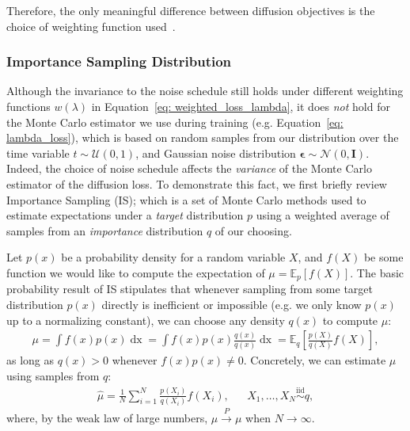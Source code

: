 Therefore, the only meaningful difference between diffusion objectives is the choice of weighting function used~\citep{kingma2023understanding}.

\subsubsection{Importance Sampling Distribution}
%
Although the invariance to the noise schedule still holds under different weighting functions $w(\lambda)$ in Equation~\ref{eq: weighted_loss_lambda}, it does \textit{not} hold for the Monte Carlo estimator we use during training (e.g. Equation~\ref{eq: lambda_loss}), which is based on random samples from our distribution over the time variable $t \sim \mathcal{U}(0,1)$, and Gaussian noise distribution $\boldsymbol{\epsilon} \sim \mathcal{N}(0,\mathbf{I})$. Indeed, the choice of noise schedule affects the \textit{variance} of the Monte Carlo estimator of the diffusion loss. To demonstrate this fact, we first briefly review Importance Sampling (IS); which is a set of Monte Carlo methods used to estimate expectations under a \textit{target} distribution $p$ using a weighted average of samples from an \textit{importance} distribution $q$ of our choosing. 

Let $p(x)$ be a probability density for a random variable $X$, and $f(X)$ be some function we would like to compute the expectation of $\mu = \mathbb{E}_p\left[f(X)\right]$. The basic probability result of IS stipulates that whenever sampling from some target distribution $p(x)$ directly is inefficient or impossible (e.g. we only know $p(x)$ up to a normalizing constant), we can choose any density $q(x)$ to compute $\mu$:   
%
\begin{align}
    \mu = \int f(x)p(x) \mathop{\mathrm{d}x} = \int f(x) p(x) \frac{q(x)}{q(x)} \mathop{\mathrm{d}x} = \mathbb{E}_{q}\left[ \frac{p(X)}{q(X)}f(X)\right],
\end{align}
%
as long as $q(x) > 0$ whenever $f(x)p(x) \neq 0$. Concretely, we can estimate $\mu$ using samples from $q$:
%
\begin{align}
    &&\widehat{\mu} = \frac{1}{N} \sum_{i=1}^N \frac{p(X_i)}{q(X_i)}f(X_i), &&X_1,\dots,X_N \mathop{\sim}\limits^{\mathrm{iid}} q,&&
\end{align}
%
where, by the weak law of large numbers, $\widehat{\mu} \xrightarrow{P} \mu$ when $N \rightarrow \infty$.

